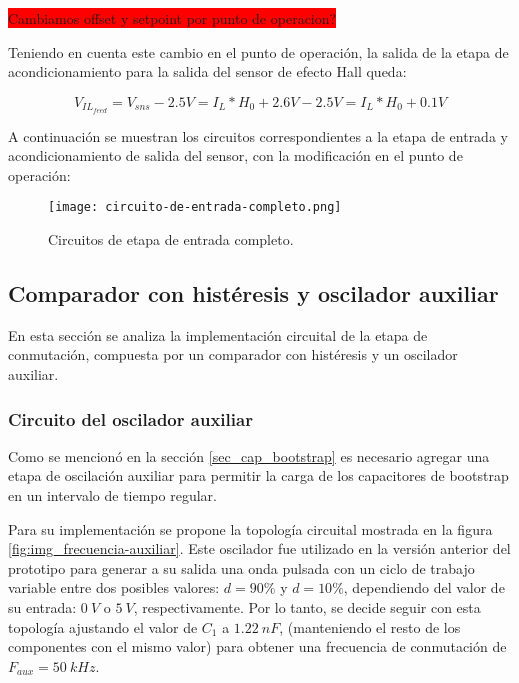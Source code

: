 \colorbox{red}{Cambiamos offset y setpoint por punto de operacion?}

Teniendo en cuenta este cambio en el punto de operación, la salida de la etapa de acondicionamiento para la salida del sensor de efecto Hall queda:

\begin{equation} \label{eq_salida_restador_hall_2}
	V_{IL_{feed}}=V_{sns}-2.5V =I_L*H_0 + 2.6V - 2.5V =I_L*H_0+0.1V
\end{equation}

A continuación se muestran los circuitos correspondientes a la etapa de entrada y acondicionamiento de salida del sensor, con la modificación en el punto de operación:

\begin{figure}[H]
	\centering
	\texttt{[image: circuito-de-entrada-completo.png]}
	\caption{Circuitos de etapa de entrada completo.}
	\label{fig:img_circuito-de-entrada-completo.png}
\end{figure}


\subsection{Comparador con histéresis y oscilador auxiliar}

En esta sección se analiza la implementación circuital de la etapa de conmutación, compuesta por un comparador con histéresis y un oscilador auxiliar.

\subsubsection{Circuito del oscilador auxiliar}

Como se mencionó en la sección \ref{sec_cap_bootstrap} es necesario agregar una etapa de oscilación auxiliar para permitir la carga de los capacitores de bootstrap en un intervalo de tiempo regular.

Para su implementación se propone la topología circuital mostrada en la figura \ref{fig:img_frecuencia-auxiliar}. Este oscilador fue utilizado en la versión anterior del prototipo para generar a su salida una onda pulsada con un ciclo de trabajo variable entre dos posibles valores: $d=90\%$ y $d=10\%$, dependiendo del valor de su entrada: $0\:V$ o $5\:V$, respectivamente. Por lo tanto, se decide seguir con esta topología ajustando el valor de $C_1$ a $1.22\:nF$, (manteniendo el resto de los componentes con el mismo valor) para obtener una frecuencia de conmutación de $F_{aux}=50\:kHz$.

